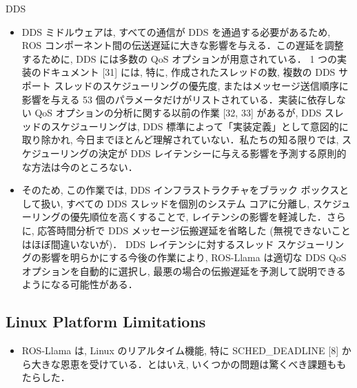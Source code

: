 \begin{frame}{DDS}
    \begin{itemize}
        \item DDS ミドルウェアは, すべての通信が DDS を通過する必要があるため, ROS コンポーネント間の伝送遅延に大きな影響を与える．この遅延を調整するために, DDS には多数の QoS オプションが用意されている． 1 つの実装のドキュメント [31] には, 特に, 作成されたスレッドの数, 複数の DDS サポート スレッドのスケジューリングの優先度, またはメッセージ送信順序に影響を与える 53 個のパラメータだけがリストされている．実装に依存しない QoS オプションの分析に関する以前の作業 [32, 33] があるが, DDS スレッドのスケジューリングは, DDS 標準によって「実装定義」として意図的に取り除かれ, 今日までほとんど理解されていない．私たちの知る限りでは, スケジューリングの決定が DDS レイテンシーに与える影響を予測する原則的な方法は今のところない．
    \end{itemize}
\end{frame}

\begin{frame}{}
    \begin{itemize}
        \item そのため, この作業では, DDS インフラストラクチャをブラック ボックスとして扱い, すべての DDS スレッドを個別のシステム コアに分離し, スケジューリングの優先順位を高くすることで, レイテンシの影響を軽減した．さらに, 応答時間分析で DDS メッセージ伝搬遅延を省略した (無視できないことはほぼ間違いないが)． DDS レイテンシに対するスレッド スケジューリングの影響を明らかにする今後の作業により, ROS-Llama は適切な DDS QoS オプションを自動的に選択し, 最悪の場合の伝搬遅延を予測して説明できるようになる可能性がある．
    \end{itemize}
\end{frame}


\subsection{Linux Platform Limitations}
\label{ssec: linux platform limitations}

\begin{frame}{}
    \begin{itemize}
        \item ROS-Llama は, Linux のリアルタイム機能, 特に SCHED\_DEADLINE [8] から大きな恩恵を受けている．とはいえ, いくつかの問題は驚くべき課題ももたらした．
    \end{itemize}
\end{frame}

